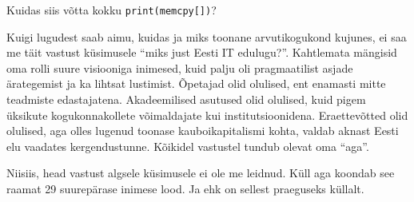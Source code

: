Kuidas siis võtta kokku \verb|print(memcpy[])|? 

Kuigi lugudest saab aimu, kuidas ja miks toonane arvutikogukond kujunes, ei saa 
me täit vastust küsimusele \enquote{miks just Eesti IT edulugu?}. Kahtlemata
mängisid oma rolli suure visiooniga inimesed, kuid palju oli pragmaatilist 
asjade ärategemist ja ka lihtsat lustimist. Õpetajad olid olulised, ent
enamasti mitte teadmiste edastajatena. Akadeemilised asutused olid olulised, 
kuid pigem üksikute kogukonnakollete võimaldajate kui institutsioonidena. 
Eraettevõtted olid olulised, aga olles lugenud toonase kauboikapitalismi 
kohta, valdab aknast Eesti elu vaadates kergendustunne. Kõikidel vastustel 
tundub olevat oma \enquote{aga}.

Niisiis, head vastust algsele küsimusele ei ole me leidnud. Küll aga koondab 
see raamat 29 suurepärase inimese lood. Ja ehk on sellest praeguseks küllalt.
